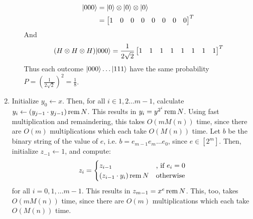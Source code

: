 \documentclass[11pt,a4paper]{article}
\begin{document}
\begin{enumerate}
\begin{enumerate}
                    \begin{align*}
                        |000\rangle & = |0\rangle \otimes |0\rangle \otimes |0\rangle \\
                                 & = \begin{bmatrix}
                                         1 & 0 & 0 & 0 & 0 & 0 & 0 & 0
                                     \end{bmatrix}^T
                    \end{align*}
                    And
                    \begin{align*}
                        (H \otimes H \otimes H)|000\rangle = \frac{1}{2\sqrt{2}} \begin{bmatrix}
                                                                                  1 & 1 & 1 & 1 & 1 & 1 & 1 & 1
                                                                              \end{bmatrix}^T
                    \end{align*}
                    Thus each outcome $|000\rangle \dots |111\rangle$ have the same probability $P = (\frac{1}{2\sqrt{2}})^2 = \frac{1}{8}$.
          \end{enumerate}
          \newpage
    \item Initialize $y_0 \gets x$. Then, for all $i \in 1, 2 \dots m - 1$, calculate \\ $y_i \gets (y_{j-1} \cdot y_{j-1}) \operatorname{rem}{N}$.
          This results in $y_i = y^{2^i} \operatorname{rem}{N}$. Using fast multiplication and remaindering, this takes $O(mM(n))$ time, since there are $O(m)$ multiplications which each take
          $O(M(n))$ time. Let $b$ be the binary string of the value of $e$, i.e. $b = e_{m-1} e_m \dots e_0$, since $e \in [2^m]$.
          Then, initialize $z_{-1} \gets 1$, and compute:
          \begin{align*}
              z_i = \begin{cases}
                        z_{i - 1}                     & \text{, if }  e_i = 0 \\
                        (z_{i - 1} \cdot y_i) \operatorname{rem}{N} & \text{otherwise}
                    \end{cases}
          \end{align*}
          for all $i = 0, 1, \dots m - 1$. This results in $z_{m - 1} = x^e \operatorname{rem}{N}$. This, too, takes $O(mM(n))$ time, since there are $O(m)$ multiplications which each take $O(M(n))$ time.
          \newpage
\end{enumerate}
\end{document}
